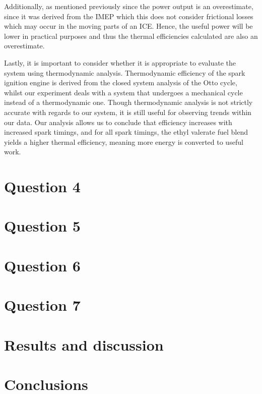 \documentclass[11pt]{article}
\begin{document}
Additionally, as mentioned previously since the power output is an overestimate, since it was derived from the IMEP which this does not consider frictional losses which may occur in the moving parts of an ICE. Hence, the useful power will be lower in practical purposes and thus the thermal efficiencies calculated are also an overestimate. 

Lastly, it is important to consider whether it is appropriate to evaluate the system using thermodynamic analysis. Thermodynamic efficiency of the spark ignition engine is derived from the closed system analysis of the Otto cycle, whilst our experiment deals with a system that undergoes a mechanical cycle instead of a thermodynamic one. Though thermodynamic analysis is not strictly accurate with regards to our system, it is still useful for observing trends within our data. Our analysis allows us to conclude that efficiency increases with increased spark timings, and for all spark timings, the ethyl valerate fuel blend yields a higher thermal efficiency, meaning more energy is converted to useful work.  
\section*{Question 4}
\section*{Question 5}
\section*{Question 6}
\section*{Question 7}
\section*{Results and discussion}
\section*{Conclusions}
\begin{thebibliography}{00}

\end{thebibliography}
\end{document}

